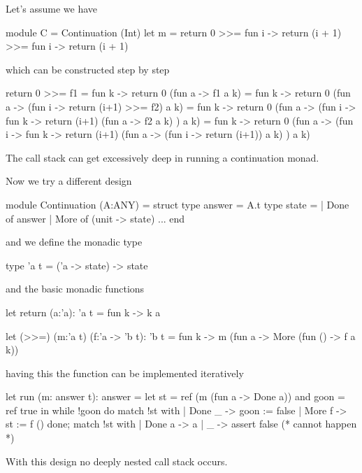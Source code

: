 Let's assume we have
\begin{ocaml}
   module C = Continuation (Int)
   let m = return 0 >>= fun i -> return (i + 1) >>= fun i -> return (i + 1)
\end{ocaml}
%
which can be constructed step by step
\begin{ocaml}
  return 0 >>= f1
  =
  fun k -> return 0 (fun a -> f1 a k)
  =
  fun k -> return 0 (fun a -> (fun i -> return (i+1) >>= f2) a k)
  =
  fun k -> return
             0
             (fun a -> (fun i ->
                          fun k ->
                            return
                              (i+1)
                              (fun a -> f2 a k)
                       ) a k)
  =
  fun k -> return
             0
             (fun a -> (fun i ->
                          fun k ->
                            return
                              (i+1)
                              (fun a -> (fun i -> return (i+1)) a k)
                       ) a k)
\end{ocaml}
%
The call stack can get excessively deep in running a continuation monad.

Now we try a different design
%
\begin{ocaml}
  module Continuation (A:ANY) =
  struct
    type answer = A.t
    type state =
      | Done of answer
      | More of (unit -> state)
    ...
  end
\end{ocaml}
%
and we define the monadic type
\begin{ocaml}
  type 'a t = ('a -> state) -> state
\end{ocaml}
%
and the basic monadic functions
\begin{ocaml}
  let return (a:'a): 'a t =
    fun k -> k a

  let (>>=) (m:'a t) (f:'a -> 'b t): 'b t =
    fun k -> m (fun a -> More (fun () -> f a k))
\end{ocaml}
%
having this the function  can be implemented iteratively
\begin{ocaml}
  let run (m: answer t): answer =
    let st = ref (m (fun a -> Done a))
    and goon = ref true
    in
    while !goon do
      match !st with
      | Done _ ->
         goon := false
      | More f ->
         st := f ()
    done;
    match !st with
    | Done a ->
       a
    | _ ->
       assert false (* cannot happen *)
\end{ocaml}
%
With this design no deeply nested call stack occurs.






